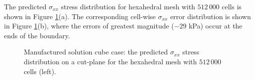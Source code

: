 \documentclass[sn-mathphys,Numbered]{sn-jnl}%
\begin{document}
The predicted $\sigma_{xx}$ stress distribution for hexahedral mesh with $512\,000$ cells is shown in Figure \ref{fig:mms_stress}(a).
The corresponding cell-wise $\sigma_{xx}$ error distribution is shown in Figure \ref{fig:mms_stress}(b), where the errors of greatest magnitude ($-29$ kPa) occur at the ends of the boundary.
\begin{figure}[htbp]
	\centering
	\caption{Manufactured solution cube case: the predicted $\sigma_{xx}$ stress distribution on a cut-plane for the hexahedral mesh with $512\,000$ cells (left).}
	\label{fig:mms_stress}
\end{figure}
\end{document}
